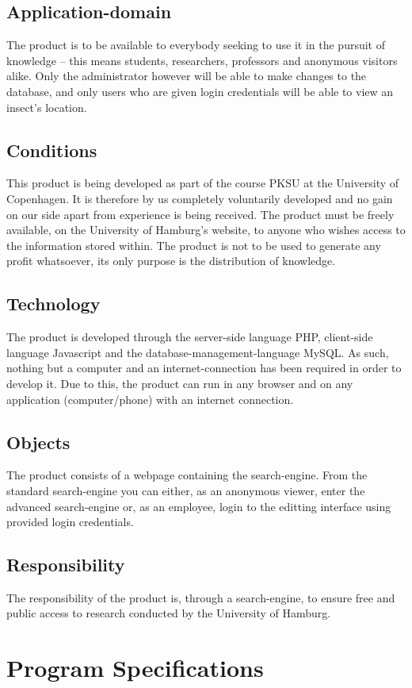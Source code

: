 \documentclass[12pt,a4paper]{article}
\begin{document}
\subsection{Application-domain}
The product is to be available to everybody seeking to use it in the pursuit of knowledge – this means students, researchers, professors and anonymous visitors alike.
Only the administrator however will be able to make changes to the database, and only users who are given login credentials will be able to view an insect's location.
\subsection{Conditions}
This product is being developed as part of the course PKSU at the University of Copenhagen. It is therefore by us completely voluntarily developed and no gain on our side apart from experience is being received. 
The product must be freely available, on the University of Hamburg's website, to anyone who wishes access to the information stored within. The product is not to be used to generate any profit whatsoever, its only purpose is the distribution of knowledge.
\subsection{Technology}
The product is developed through the server-side language PHP, client-side language Javascript and the database-management-language MySQL. As such, nothing but a computer and an internet-connection has been required in order to develop it.
Due to this, the product can run in any browser and on any application (computer/phone) with an internet connection.
\subsection{Objects}
The product consists of a webpage containing the search-engine. From the standard search-engine you can either, as an anonymous viewer, enter the advanced search-engine or, as an employee, login to the editting interface using provided login credentials.
\subsection{Responsibility}
The responsibility of the product is, through a search-engine, to ensure free and public access to research conducted by the University of Hamburg. 
\newpage
\section{Program Specifications}
\end{document}

